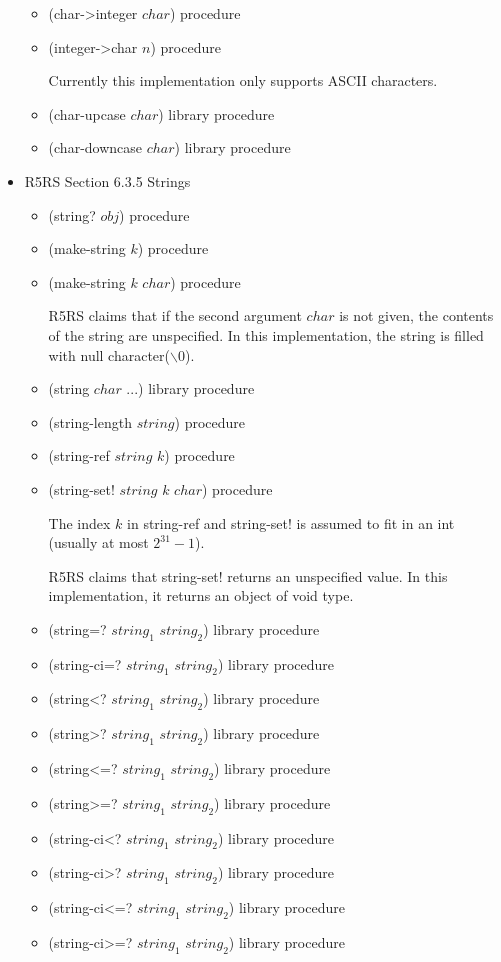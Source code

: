 \documentclass{article}
\begin{document}
\begin{itemize}
\begin{itemize}
		\item (char->integer $char$)	\hfill	procedure
		\item (integer->char $n$)	\hfill	procedure
		
			Currently this implementation only supports ASCII characters.
			
		\item (char-upcase $char$)	\hfill	library procedure
		\item (char-downcase $char$)	\hfill	library procedure
	\end{itemize}

\item R5RS Section 6.3.5 Strings
	\begin{itemize}
		\item (string? $obj$)	\hfill	procedure
		
		\item (make-string $k$)	\hfill	procedure
		\item (make-string $k$ $char$)	\hfill	procedure
		
		R5RS claims that if the second argument $char$ is not given, the contents of the string are unspecified. In this implementation, the string is filled with null character($\backslash$0).
		
		\item (string $char$ ...)	\hfill	library procedure
		
		\item (string-length $string$)	\hfill	procedure
		
		\item (string-ref $string$ $k$)	\hfill	procedure
		\item (string-set! $string$ $k$ $char$)	\hfill	procedure
		
		The index $k$ in string-ref and string-set! is assumed to fit in an int (usually at most $2^{31}-1$).
		
		R5RS claims that string-set! returns an unspecified value. In this implementation, it returns an object of void type.
		
		\item (string=? $string_1$ $string_2$)	\hfill	library procedure
		\item (string-ci=? $string_1$ $string_2$)	\hfill	library procedure
		\item (string<? $string_1$ $string_2$)	\hfill	library procedure
		\item (string>? $string_1$ $string_2$)	\hfill	library procedure
		\item (string<=? $string_1$ $string_2$)	\hfill	library procedure
		\item (string>=? $string_1$ $string_2$)	\hfill	library procedure
		\item (string-ci<? $string_1$ $string_2$)	\hfill	library procedure
		\item (string-ci>? $string_1$ $string_2$)	\hfill	library procedure
		\item (string-ci<=? $string_1$ $string_2$)	\hfill	library procedure
		\item (string-ci>=? $string_1$ $string_2$)	\hfill	library procedure
		

\end{itemize}
\end{itemize}
\end{document}
